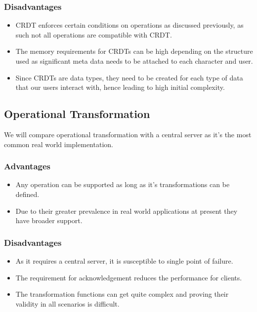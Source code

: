 \documentclass[12pt]{article}
\begin{document}
  \subsubsection{Disadvantages}
  \begin{itemize}
    \item CRDT enforces certain conditions on operations as discussed previously, as such not all operations are compatible with CRDT.
    \item The memory requirements for CRDTs can be high depending on the structure used as significant meta data needs to be attached to each character and user.
    \item Since CRDTs are data types, they need to be created for each type of data that our users interact with, hence leading to high initial complexity.
  \end{itemize}

  \subsection{Operational Transformation}
  We will compare operational transformation with a central server as it's the most common real world implementation.

  \subsubsection{Advantages}
  \begin{itemize}
    \item Any operation can be supported as long as it's transformations can be defined.
    \item Due to their greater prevalence in real world applications at present they have broader support.
  \end{itemize}

  \subsubsection{Disadvantages}
  \begin{itemize}
    \item As it requires a central server, it is susceptible to single point of failure.
    \item The requirement for acknowledgement reduces the performance for clients.
    \item The transformation functions can get quite complex and proving their validity in all scenarios is difficult.
  \end{itemize}
\end{document}

